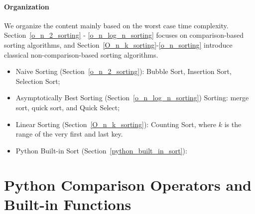 \documentclass[../main.tex]{subfiles}
\begin{document}
\paragraph{Organization} We organize the content mainly based on the worst case time complexity. Section~\ref{o_n_2_sorting} - \ref{o_n_log_n_sorting} focuses on comparison-based sorting algorithms, and Section~\ref{O_n_k_sorting}-\ref{o_n_sorting} introduce classical non-comparison-based sorting algorithms. %
\begin{itemize}
\item Naive Sorting (Section~\ref{o_n_2_sorting}): Bubble Sort, Insertion Sort, Selection Sort;
\item Asymptotically Best Sorting (Section~\ref{o_n_log_n_sorting}) Sorting: merge sort, quick sort, and Quick Select;
\item Linear Sorting (Section~\ref{O_n_k_sorting}): Counting Sort, where $k$ is the range of the very first and last key.
\item  Python Built-in Sort (Section~\ref{python_built_in_sort}):  
\end{itemize}


\section{Python Comparison Operators and Built-in Functions} 
\end{document}
